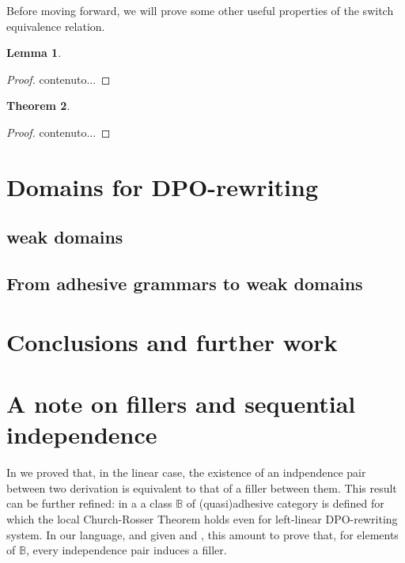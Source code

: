 \documentclass[a4paper]{article}
\newtheorem{theorem}{Theorem}[section]
\newtheorem{lemma}[theorem]{Lemma}
\theoremstyle{definition}
\begin{document}
Before moving forward, we will prove some other useful properties of the switch equivalence relation.

\begin{lemma}
\end{lemma}
\begin{proof}
	contenuto...
\end{proof}


\begin{theorem}
\end{theorem}
\begin{proof}
	contenuto...
\end{proof}


\section{ Domains for DPO-rewriting}

\subsection{weak domains}

\subsection{From adhesive grammars to weak domains}

\section{Conclusions and further work}





\appendix


\section{A note on fillers and sequential independence}\label{app:fill}
 In  we proved that, in the linear case, the existence of an indpendence pair between two derivation is equivalent to that of a filler between them. This result can be further refined: in a\cite{baldan2011adhesivity} a class  $\mathbb{B}$ of (quasi)adhesive category is defined for which the local Church-Rosser Theorem holds even for left-linear DPO-rewriting system. In our language, and given  and , this amount to prove that, for elements of $\mathbb{B}$, every independence pair induces a filler. 
\end{document}
